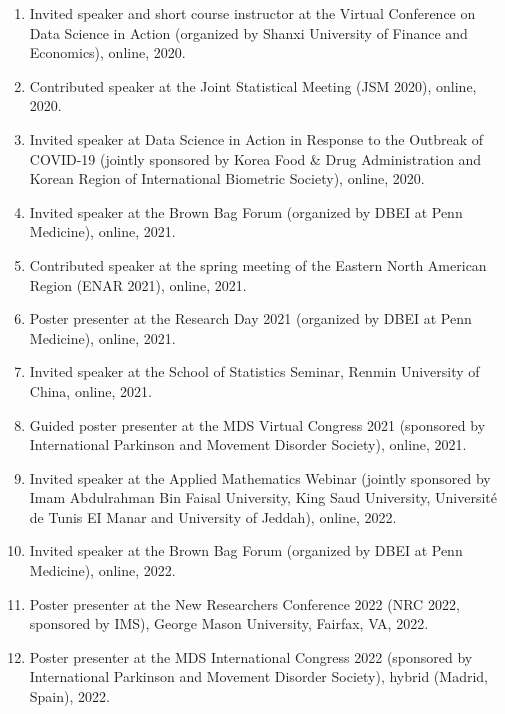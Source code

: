 \documentclass[12pt]{article}
\begin{document}
\begin{enumerate}
		\item Invited speaker and short course instructor at the Virtual Conference on Data Science in Action (organized by Shanxi 	University of Finance and Economics), online, 2020.
		
		\item Contributed speaker at the Joint Statistical Meeting (JSM 2020), online, 2020.
		
		\item Invited speaker at Data Science in Action in Response to the Outbreak of COVID-19 (jointly sponsored by Korea Food \& Drug Administration and	Korean Region of International Biometric Society), online, 2020.
		
		\item Invited speaker at the Brown Bag Forum (organized by DBEI at Penn Medicine), online, 2021.
		
		\item Contributed speaker at the spring meeting of the Eastern North American Region (ENAR 2021), online, 2021.
		
		\item Poster presenter at the Research Day 2021 (organized by DBEI at Penn Medicine), online, 2021.
		
		\item Invited speaker at the School of Statistics Seminar, 
		Renmin University of China, online, 2021.
		
		\item Guided poster presenter at the MDS Virtual Congress 2021 (sponsored by International Parkinson and Movement Disorder Society), online, 2021.
		
		\item Invited speaker at the Applied Mathematics Webinar 
		(jointly sponsored by Imam Abdulrahman Bin Faisal University, King Saud University, Universit\'{e} de Tunis EI Manar and University of Jeddah), online, 2022.
		
		\item Invited speaker at the Brown Bag Forum (organized by DBEI at Penn Medicine), online, 2022.
		
		\item Poster presenter at the New Researchers Conference 
		2022 (NRC 2022, sponsored by IMS), George Mason University, 
		Fairfax, VA, 2022.
	
		\item Poster presenter at the MDS International Congress 2022 (sponsored by International Parkinson and Movement Disorder Society), hybrid (Madrid, Spain), 2022.
		

\end{enumerate}
\end{document}
